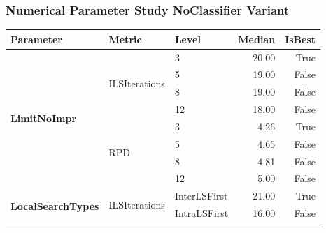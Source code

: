 \subsubsection{Numerical Parameter Study NoClassifier Variant}
\begin{table}[!ht]
	\scriptsize
	\centering
	\renewcommand{\multirowsetup}{\centering}
	\begin{tabular}{l l l r r}
		\toprule
		\textbf{Parameter}                             & \textbf{Metric}                   & \textbf{Level}        & \textbf{Median} & \textbf{IsBest} \\
		\midrule
		\multirow[t]{8}{*}{\textbf{LimitNoImpr}}       & \multirow[t]{4}{*}{ILSIterations} & 3                     & 20.00           & True            \\\cmidrule(lr){3-5}
		                                               &                                   & 5                     & 19.00           & False           \\\cmidrule(lr){3-5}
		                                               &                                   & 8                     & 19.00           & False           \\\cmidrule(lr){3-5}
		                                               &                                   & 12                    & 18.00           & False           \\\cmidrule(lr){2-5}
		                                               & \multirow[t]{4}{*}{RPD}           & 3                     & 4.26            & True            \\\cmidrule(lr){3-5}
		                                               &                                   & 5                     & 4.65            & False           \\\cmidrule(lr){3-5}
		                                               &                                   & 8                     & 4.81            & False           \\\cmidrule(lr){3-5}
		                                               &                                   & 12                    & 5.00            & False           \\\midrule
		\multirow[t]{4}{*}{\textbf{LocalSearchTypes}}  & \multirow[t]{2}{*}{ILSIterations} & InterLSFirst          & 21.00           & True            \\\cmidrule(lr){3-5}
		                                               &                                   & IntraLSFirst          & 16.00           & False           \\\cmidrule(lr){2-5}

\end{tabular}
\end{table}
